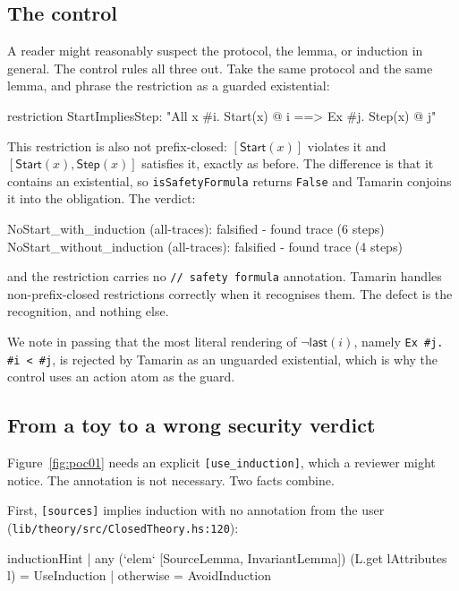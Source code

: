 \documentclass[version=preprint]{iacrcc}
\newcommand{\code}[1]{\texttt{\small #1}}
\newcommand{\tmc}[1]{\lstinline[style=tbase,language=TamarinL,
  backgroundcolor=\color{white},frame=none,basicstyle=\ttfamily\small]|#1|}
\theoremstyle{definition}
\theoremstyle{remark}
\begin{document}
\subsection{The control}\label{sec:control1}

A reader might reasonably suspect the protocol, the lemma, or induction in
general. The control rules all three out. Take the same protocol and the same
lemma, and phrase the restriction as a guarded existential:

\begin{tmlisting}
	restriction StartImpliesStep:
	"All x #i. Start(x) @ i ==> Ex #j. Step(x) @ j"
\end{tmlisting}

This restriction is also not prefix-closed: $[\mathsf{Start}(x)]$ violates it
and $[\mathsf{Start}(x),\mathsf{Step}(x)]$ satisfies it, exactly as before. The
difference is that it contains an existential, so \code{isSafetyFormula}
returns \code{False} and Tamarin conjoins it into the obligation. The verdict:

\begin{outlisting}
	NoStart_with_induction    (all-traces): falsified - found trace (6 steps)
	NoStart_without_induction (all-traces): falsified - found trace (4 steps)
\end{outlisting}

and the restriction carries no \code{// safety formula} annotation. Tamarin
handles non-prefix-closed restrictions correctly when it recognises them. The
defect is the recognition, and nothing else.

We note in passing that the most literal rendering of $\neg\mathsf{last}(i)$,
namely \tmc{Ex #j. #i < #j}, is rejected by Tamarin as an unguarded
existential, which is why the control uses an action atom as the guard.

\subsection{From a toy to a wrong security verdict}\label{sec:chain}

Figure~\ref{fig:poc01} needs an explicit \code{[use\_induction]}, which a
reviewer might notice. The annotation is not necessary. Two facts combine.

First, \code{[sources]} implies induction with no annotation from the user
(\code{lib/theory/src/ClosedTheory.hs:120}):

\begin{hslisting}
	inductionHint
	| any (`elem` [SourceLemma, InvariantLemma])
	(L.get lAttributes l) = UseInduction
	| otherwise                 = AvoidInduction
\end{hslisting}
\end{document}
